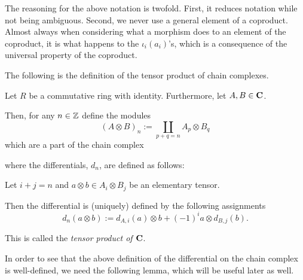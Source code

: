 The reasoning for the above notation is twofold. First, it reduces notation while not being ambiguous. Second, we never use a general element of a coproduct. Almost always when considering what a morphism does to an element of the coproduct, it is what happens to the \( \iota_i(a_i) \)'s, which is a consequence of the universal property of the coproduct.

The following is the definition of the tensor product of chain complexes.

\begin{definition}
    \label{def:tensor_product_of_chain_complexes_over_Mod(R)}
    Let \( R \) be a commutative ring with identity. Furthermore, let \( A, B \in \operatorname{\mathbf{C}} \).

    Then, for any  \( n \in {\mathbb{Z}} \) define the modules
    \[
        (A \otimes B)_n := \coprod_{p + q = n} A_p \otimes B_q
    \]
    which are a part of the chain complex
    \begin{center}
    \end{center}
    where the differentials, \( d_n \), are defined as follows:
    
    Let \( i + j = n \) and \( a \otimes b \in A_i \otimes B_j \) be an elementary tensor.

    Then the differential is (uniquely) defined by the following assignments
    \[
        d_n(a \otimes b) := d_{A, i}(a) \otimes b + (-1)^{i} a \otimes d_{B, j}(b).
    \]

    This is called the \emph{tensor product of \( \operatorname{\mathbf{C}} \)}.
\end{definition}

In order to see that the above definition of the differential on the chain complex is well-defined, we need the following lemma, which will be useful later as well.

